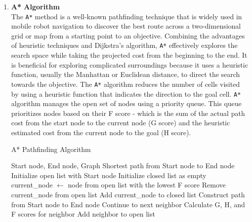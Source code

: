 \documentclass[sigconf]{acmart}
\begin{document}
\begin{enumerate}
    \item \textbf{A* Algorithm}\\
The \texttt{A*} method is a well-known pathfinding technique that is widely used in mobile robot navigation to discover the best route across a two-dimensional grid or map from a starting point to an objective. Combining the advantages of heuristic techniques and Dijkstra's algorithm, \texttt{A*} effectively explores the search space while taking the projected cost from the beginning to the end. It is beneficial for exploring complicated surroundings because it uses a heuristic function, usually the Manhattan or Euclidean distance, to direct the search towards the objective. The \texttt{A*} algorithm reduces the number of cells visited by using a heuristic function that indicates the direction to the goal cell\cite{b2}. \texttt{A*} algorithm manages the open set of nodes using a priority queue. This queue prioritizes nodes based on their F score - which is the sum of the actual path cost from the start node to the current node (G score) and the heuristic estimated cost from the current node to the goal (H score).

\begin{algorithm}
\caption{A* Pathfinding Algorithm}
\begin{algorithmic}[1]
\REQUIRE Start node, End node, Graph
\ENSURE Shortest path from Start node to End node
\STATE Initialize open list with Start node
\STATE Initialize closed list as empty
    \STATE current\_node $\leftarrow$ node from open list with the lowest F score
    \STATE Remove current\_node from open list
    \STATE Add current\_node to closed list
        \RETURN Construct path from Start node to End node
    \ENDIF
            \STATE Continue to next neighbor
        \ENDIF
        \STATE Calculate G, H, and F scores for neighbor
            \STATE Add neighbor to open list
        \ENDIF
    \ENDFOR
\ENDWHILE
\end{algorithmic}
\end{algorithm}







\end{enumerate}
\end{document}
